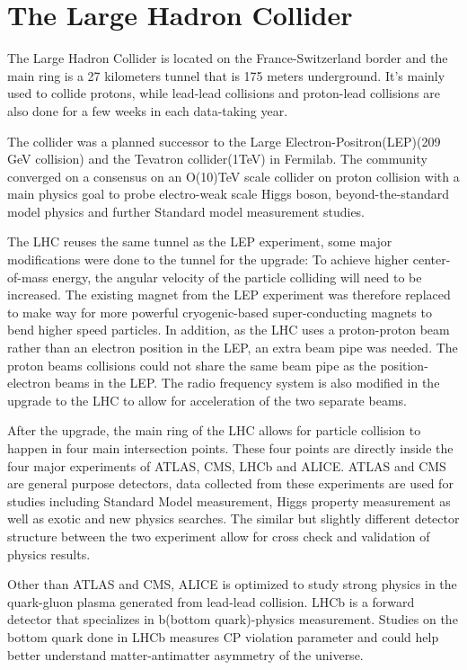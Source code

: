 
\section{The Large Hadron Collider}
\label{LHC}

The Large Hadron Collider is located on the France-Switzerland border and the main ring is a 27 kilometers tunnel that is 175 meters underground. It's mainly used to collide protons, while lead-lead collisions and proton-lead collisions are also done for a few weeks in each data-taking year. 


The collider was a planned successor to the Large Electron-Positron(LEP)(209 GeV collision) and the Tevatron collider(1TeV) in Fermilab. The community converged on a consensus on an O(10)TeV scale collider on proton collision with a main physics goal to probe electro-weak scale Higgs boson, beyond-the-standard model physics and further Standard model measurement studies.

The LHC reuses the same tunnel as the LEP experiment, some major modifications were done to the tunnel for the upgrade: To achieve higher center-of-mass energy, the angular velocity of the particle colliding will need to be increased. The existing magnet from the LEP experiment was therefore replaced to make way for more powerful cryogenic-based super-conducting magnets to bend higher speed particles. In addition, as the LHC uses a proton-proton beam rather than an electron position in the LEP, an
extra beam pipe was needed. The proton beams collisions could not share the same beam pipe as the position-electron beams in the LEP. The radio frequency system is also modified in the upgrade to the LHC to allow for acceleration of the two separate beams. 


After the upgrade, the main ring of the LHC allows for particle collision to happen in four main intersection points. These four points are directly inside the four major experiments of ATLAS, CMS, LHCb and ALICE. 
ATLAS and CMS are general purpose detectors, data collected from these experiments are used for studies including Standard Model measurement, Higgs property measurement as well as exotic and new physics searches. The similar but slightly different detector structure between the two experiment allow for cross check
and validation of physics results.

Other than ATLAS and CMS, ALICE is optimized to study strong physics in the quark-gluon plasma generated from lead-lead collision. LHCb is a forward detector that specializes in b(bottom quark)-physics measurement. Studies on the bottom quark done in LHCb measures CP violation parameter and could help better understand matter-antimatter asymmetry of the universe. 

